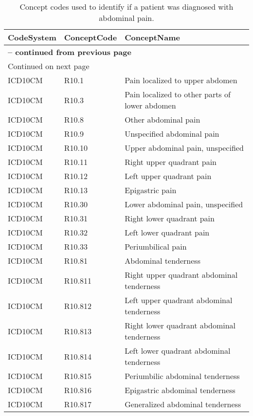 \begin{longtable}{p{}p{}p{}}
\caption{Concept codes used to identify if a patient was diagnosed with abdominal pain.} \\ 
 CodeSystem & ConceptCode & ConceptName \\ 
  \hline 
\endfirsthead 
\multicolumn{3}{p{\textwidth}}{{ \bfseries \tablename \thetable{} -- continued from previous page}} \ 
\hline CodeSystem & ConceptCode & ConceptName \\ \hline 
\endhead 
\hline \multicolumn{3}{p{\textwidth}}{{Continued on next page}} \\ \hline 
\endfoot 
\hline 
\endlastfoot 
 \hline
ICD10CM & R10.1 & Pain localized to upper abdomen \\ 
  ICD10CM & R10.3 & Pain localized to other parts of lower abdomen \\ 
  ICD10CM & R10.8 & Other abdominal pain \\ 
  ICD10CM & R10.9 & Unspecified abdominal pain \\ 
  ICD10CM & R10.10 & Upper abdominal pain, unspecified \\ 
  ICD10CM & R10.11 & Right upper quadrant pain \\ 
  ICD10CM & R10.12 & Left upper quadrant pain \\ 
  ICD10CM & R10.13 & Epigastric pain \\ 
  ICD10CM & R10.30 & Lower abdominal pain, unspecified \\ 
  ICD10CM & R10.31 & Right lower quadrant pain \\ 
  ICD10CM & R10.32 & Left lower quadrant pain \\ 
  ICD10CM & R10.33 & Periumbilical pain \\ 
  ICD10CM & R10.81 & Abdominal tenderness \\ 
  ICD10CM & R10.811 & Right upper quadrant abdominal tenderness \\ 
  ICD10CM & R10.812 & Left upper quadrant abdominal tenderness \\ 
  ICD10CM & R10.813 & Right lower quadrant abdominal tenderness \\ 
  ICD10CM & R10.814 & Left lower quadrant abdominal tenderness \\ 
  ICD10CM & R10.815 & Periumbilic abdominal tenderness \\ 
  ICD10CM & R10.816 & Epigastric abdominal tenderness \\ 
  ICD10CM & R10.817 & Generalized abdominal tenderness \\ 

\end{longtable}
